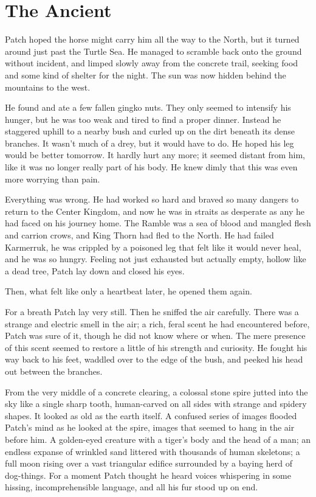 \documentclass[ebook,oneside,openany,17pt]{memoir}
\renewcommand{\thechapter}{\Roman{chapter}}
\newcounter{sections}
\newcommand{\sections}[1]{%
  \section*{#1}
  \addtocounter{sections}{1}%
  \pdfbookmark[1]{#1}{section.\thechapter.\thesections}}
\begin{document}

\sections{The Ancient}

Patch hoped the horse might carry him all the way to the North, but it
turned around just past the Turtle Sea. He managed to scramble back
onto the ground without incident, and limped slowly away from the
concrete trail, seeking food and some kind of shelter for the
night. The sun was now hidden behind the mountains to the west.

He found and ate a few fallen gingko nuts. They only seemed to
intensify his hunger, but he was too weak and tired to find a proper
dinner. Instead he staggered uphill to a nearby bush and curled up on
the dirt beneath its dense branches. It wasn’t much of a drey, but it
would have to do. He hoped his leg would be better tomorrow. It hardly
hurt any more; it seemed distant from him, like it was no longer
really part of his body. He knew dimly that this was even more
worrying than pain.

Everything was wrong. He had worked so hard and braved so many dangers
to return to the Center Kingdom, and now he was in straits as
desperate as any he had faced on his journey home. The Ramble was a
sea of blood and mangled flesh and carrion crows, and King Thorn had
fled to the North. He had failed Karmerruk, he was crippled by a
poisoned leg that felt like it would never heal, and he was so
hungry. Feeling not just exhausted but actually empty, hollow like a
dead tree, Patch lay down and closed his eyes.

Then, what felt like only a heartbeat later, he opened them again.

For a breath Patch lay very still. Then he sniffed the air
carefully. There was a strange and electric smell in the air; a rich,
feral scent he had encountered before, Patch was sure of it, though he
did not know where or when. The mere presence of this scent seemed to
restore a little of his strength and curiosity. He fought his way back
to his feet, waddled over to the edge of the bush, and peeked his head
out between the branches.

From the very middle of a concrete clearing, a colossal stone spire
jutted into the sky like a single sharp tooth, human-carved on all
sides with strange and spidery shapes. It looked as old as the earth
itself. A confused series of images flooded Patch’s mind as he looked
at the spire, images that seemed to hang in the air before him. A
golden-eyed creature with a tiger’s body and the head of a man; an
endless expanse of wrinkled sand littered with thousands of human
skeletons; a full moon rising over a vast triangular edifice
surrounded by a baying herd of dog-things. For a moment Patch thought
he heard voices whispering in some hissing, incomprehensible language,
and all his fur stood up on end.
\end{document}
